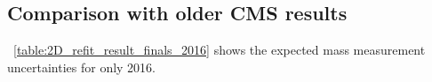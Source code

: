 \subsection{Comparison with older CMS results}
\tablename~\ref{table:2D_refit_result_finals_2016} shows the expected mass measurement uncertainties for only 2016. 
